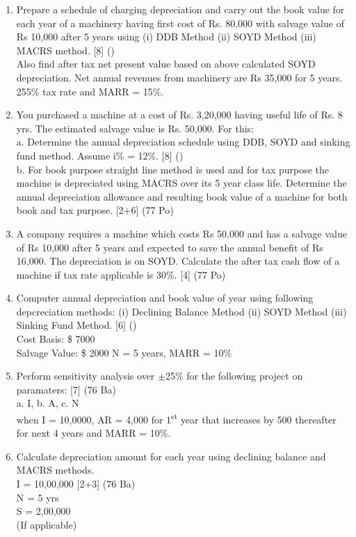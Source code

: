 \documentclass[12pt]{article}
\newcommand{\super}[1]{\textsuperscript{#1}}
\begin{document}
\begin{enumerate}
			\item Prepare a schedule of charging depreciation and carry out the book value for each year of a machinery having first cost of Rs. 80,000 with salvage value of Rs 10,000 after 5 years using (i) DDB Method (ii) SOYD Method (iii) MACRS method. \hfill [8] ()\\
			Also find after tax net present value based on above calculated SOYD depreciation. Net annual revenues from machinery are Rs 35,000 for 5 years. 255\% tax rate and MARR = 15\%.

			\item You purchased a machine at a cost of Rs. 3,20,000 having useful life of Rs. 8 yrs. The estimated salvage value is Rs. 50,000. For this:\\[2pt]
			a. Determine the annual depreciation schedule using DDB, SOYD and sinking fund method. Assume i\% = 12\%. \hfill [8] ()\\[1pt]
			b. For book purpose straight line method is used and for tax purpose the machine is depreciated using MACRS over its 5 year class life. Determine the annual depreciation allowance and resulting book value of a machine for both book and tax purpose. \hfill [2+6] (77 Po)

			\item A company requires a machine which costs Rs 50,000 and has a salvage value of Rs 10,000 after 5 years and expected to save the annual benefit of Rs 16,000. The depreciation is on SOYD. Calculate the after tax cash flow of a machine if tax rate applicable is 30\%. \hfill [4] (77 Po)

			\item Computer annual depreciation and book value of year using following depcreciation methods: (i) Declining Balance Method (ii) SOYD Method (iii) Sinking Fund Method. \hfill [6] ()\\
			Cost Basis: \$ 7000\\
			Salvage Value: \$ 2000
			N = 5 years, MARR = 10\%

			\item Perform sensitivity analysis over $\pm$25\% for the following project on paramaters: \hfill [7] (76 Ba)\\
			a. I, b. A, c. N\\
			when I = 10,0000, AR = 4,000 for 1\super{st} year that increases by 500 thereafter for next 4 years and MARR = 10\%.

			\item Calculate depreciation amount for each year using declining balance and MACRS methods.\\
			I = 10,00,000 \hfill [2+3] (76 Ba)\\
			N = 5 yrs\\
			S = 2,00,000\\
			(If applicable)


\end{enumerate}
\end{document}
